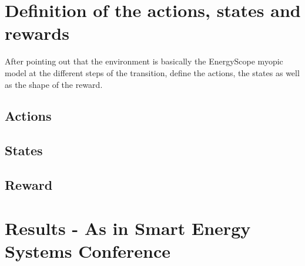 
\section{Definition of the actions, states and rewards}
\label{sec:act_states_rew}
After pointing out that the environment is basically the EnergyScope myopic model at the different steps of the transition, define the actions, the states as well as the shape of the reward.

\subsection{Actions}
\subsection{States}
\subsection{Reward}

\section{Results - As in Smart Energy Systems Conference}

%

%


